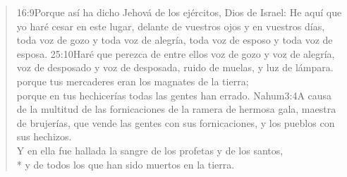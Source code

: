 \begin{verse}
					{16:9}{Porque así ha dicho Jehová de los ejércitos, Dios de Israel: He aquí que yo haré cesar en este lugar, delante de vuestros ojos y en vuestros días, toda voz de gozo y toda voz de alegría, toda voz de esposo y toda voz de esposa.}%
					{25:10}{Haré que perezca de entre ellos voz de gozo y voz de alegría, voz de desposado y voz de desposada, ruido de muelas, y luz de lámpara.}\\
 porque tus mercaderes eran los magnates de la tierra;%
	\\
 porque en tus hechicerías todas las gentes han errado.%
				{Nahum}{3:4}{A causa de la multitud de las fornicaciones de la ramera de hermosa gala, maestra de brujerías, que vende las gentes con sus fornicaciones, y los pueblos con sus hechizos.}\\
Y en ella fue hallada la sangre de los profetas y de los santos,\\*\vin
y de todos los que han sido muertos en la tierra.%
\end{verse}
